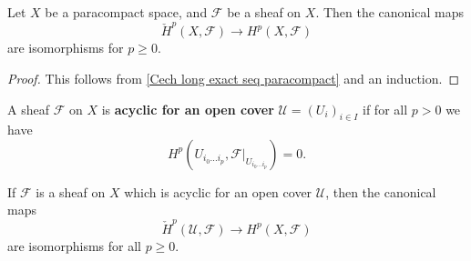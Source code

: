 \begin{proposition}
Let $X$ be a paracompact space, and $\mathscr{F}$ be a sheaf on $X$. Then the canonical maps
\[\check{H}^p(X,\mathscr{F})\to H^p(X,\mathscr{F})\]
are isomorphisms for $p\geq 0$.
\end{proposition}
\begin{proof}
This follows from \cref{Cech long exact seq paracompact} and an induction.
\end{proof}
\begin{definition}
A sheaf $\mathscr{F}$ on $X$ is \textbf{acyclic for an open cover} $\mathcal{U}=(U_i)_{i\in I}$ if for all $p>0$ we have
\[H^p(U_{i_0\dots i_p},\mathscr{F}|_{U_{i_0\dots i_p}})=0.\]
\end{definition}
\begin{theorem}\label{Leray acyclic thm}
If $\mathscr{F}$ is a sheaf on $X$ which is acyclic for an open cover $\mathcal{U}$, then the canonical maps
\[\check{H}^p(\mathcal{U},\mathscr{F})\to H^p(X,\mathscr{F})\]
are isomorphisms for all $p\geq 0$.
\end{theorem}

